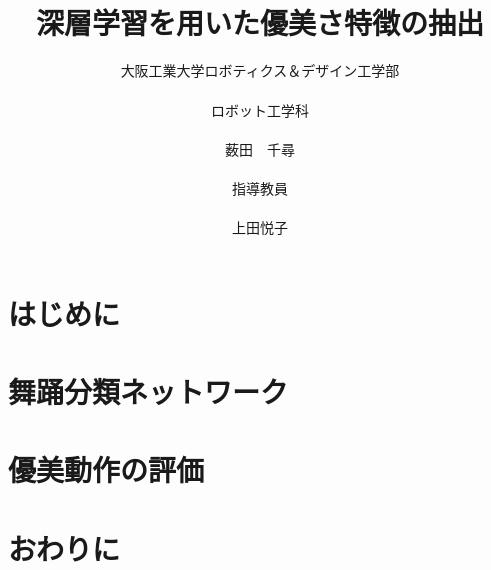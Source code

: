 \documentclass[titlepage,a4pape]{jsarticle}
\title{\vspace{-15mm}{\LARGE 2023年度　卒業論文}\\\vspace{25mm}
\huge
深層学習を用いた優美さ特徴の抽出
\vspace{20mm}\\}
\author{
\Large 大阪工業大学ロボティクス＆デザイン工学部\\\\
\vspace{5mm}\Large ロボット工学科\\
\vspace{5mm}
\vspace{0mm}\\
{\huge 薮田　千尋} \vspace{14.5mm}\\
\\\Large 指導教員\\\\\vspace{-4.0mm}
\vspace{0mm}\Large 上田悦子
}
\date{}
\begin{document}
\maketitle
\newpage


\newpage

\section{はじめに}


\clearpage
\section{舞踊分類ネットワーク}


\clearpage
\section{優美動作の評価}


\section{おわりに}


\clearpage



\end{document}
